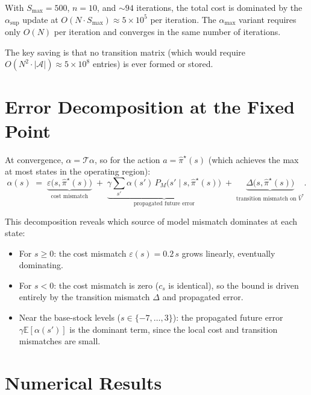 \documentclass[11pt]{article}
\newcommand{\Smax}{S_{\max}}
\newcommand{\pihatstar}{\hat\pi^\star}
\newcommand{\Vhatstar}{\hat V^\star}
\begin{document}
With $\Smax = 500$, $n = 10$, and $\sim 94$ iterations, the total cost is
dominated by the $\alpha_{\sup}$ update at $O(N \cdot \Smax) \approx 5 \times
10^5$ per iteration.  The $\alpha_{\max}$ variant requires only $O(N)$ per
iteration and converges in the same number of iterations.

The key saving is that no transition matrix (which would require
$O(N^2 \cdot |\mathcal{A}|) \approx 5 \times 10^8$ entries) is ever formed or
stored.

\section{Error Decomposition at the Fixed Point}

At convergence, $\alpha = \mathcal{T}\alpha$, so for the action
$a = \pihatstar(s)$ (which achieves the max at most states in the operating
region):
\begin{equation}\label{eq:decomposition}
  \alpha(s)
  \;=\; \underbrace{\varepsilon\bigl(s, \pihatstar(s)\bigr)}_{\text{cost mismatch}}
  \;+\; \underbrace{\gamma \sum_{s'} \alpha(s')\, P_M\bigl(s' \mid s, \pihatstar(s)\bigr)}_{\text{propagated future error}}
  \;+\; \underbrace{\Delta\bigl(s, \pihatstar(s)\bigr)}_{\text{transition mismatch on }\Vhatstar}.
\end{equation}

This decomposition reveals which source of model mismatch dominates at each
state:
\begin{itemize}
  \item For $s \ge 0$: the cost mismatch $\varepsilon(s) = 0.2\,s$ grows
        linearly, eventually dominating.
  \item For $s < 0$: the cost mismatch is zero ($c_s$ is identical), so the
        bound is driven entirely by the transition mismatch $\Delta$ and
        propagated error.
  \item Near the base-stock levels ($s \in \{-7, \ldots, 3\}$): the propagated
        future error $\gamma \mathbb{E}[\alpha(s')]$ is the dominant term, since
        the local cost and transition mismatches are small.
\end{itemize}

\section{Numerical Results}
\end{document}
